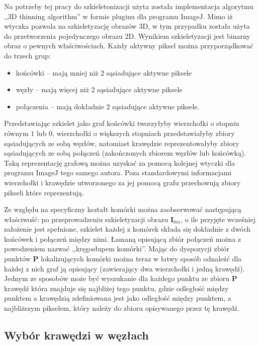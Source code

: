 \documentclass[declaration,shortabstract,mgr]{iithesis}
\newcommand{\image}{\mathbf{I}}
\begin{document}
Na potrzeby tej pracy do szkieletonizacji użyta została implementacja algorytmu ,,3D thinning algorithm''\cite{algo:3d-thinning} w formie pluginu dla programu ImageJ\cite{plugin:skeletonize3D}. Mimo iż wtyczka pozwala na szkieletyzację obrazów 3D, w tym przypadku została użyta do przetworzenia pojedynczego obrazu 2D. Wynikiem szkieletyzacji jest binarny obraz o pewnych właściwościach. Każdy aktywny piksel można przyporządkować do trzech grup:
\begin{itemize}
  \item końcówki -- mają mniej niż 2 sąsiadujące aktywne piksele
  \item węzły -- mają więcej niż 2 sąsiadujące aktywne piksele
  \item połączenia -- mają dokładnie 2 sąsiadujące aktywne piksele.
\end{itemize}
Przedstawiając szkielet jako graf końcówki tworzyłyby wierzchołki o stopniu równym $1$ lub $0$, wierzchołki o większych stopniach przedstawiałyby zbiory sąsiadujących ze sobą węzłów, natomiast krawędzie reprezentowałyby zbiory sąsiadujących ze sobą połączeń (zakończonych zbiorem węzłów lub końcówką). Taką reprezentację grafową można uzyskać za pomocą kolejnej wtyczki dla programu ImageJ tego samego autora\cite{plugin:analyzeSkeleton}. Poza standardowymi informacjami wierzchołki i krawędzie utworzonego za jej pomocą grafu przechowują zbiory pikseli które reprezentują.

Ze względu na specyficzny kształt komórki można zaobserwować następującą właściwość: po przeprowadzeniu szkieletyzacji obrazu $\image_{bin}$, o ile przyjęte wcześniej założenie jest spełnione, szkielet każdej z komórek składa się dokładnie z dwóch końcówek i połączeń między nimi. Łamaną opisującą zbiór połączeń można z powodzeniem nazwać ,,kręgosłupem komórki''. Mając do dyspozycji zbiór punktów $\mathbf{P}$ lokalizujących komórki można teraz w łatwy sposób odnaleźć dla każdej z nich graf ją opisujący (zawierający dwa wierzchołki i jedną krawędź). Jednym ze sposobów może być wyszukanie dla każdego punktu ze zbioru $\mathbf{P}$ krawędź która znajduje się najbliżej tego punktu, gdzie odległość między punktem a krawędzią zdefiniowana jest jako odległość między punktem, a najbliższym pikselem, który należy do zbioru opisywanego przez tę krawędź.

\subsection{Wybór krawędzi w węzłach}
\end{document}
